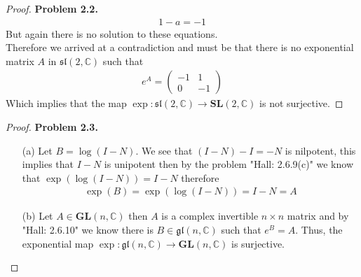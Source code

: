 \documentclass[11pt]{article}
\newcommand{\C}{\mathbb{C}}
\theoremstyle{definition}
\begin{document}
\begin{proof}{\textbf{Problem 2.2.}}
\begin{align*}
        1 - a = -1
    \end{align*}
    But again there is no solution to these equations.\\
    Therefore we arrived at a contradiction and must be that there is no
    exponential matrix $A$ in $\mathfrak{sl}(2,\C)$ such that
    \begin{align*}
        e^A = \begin{pmatrix}-1 & 1\\ 0 & -1 \end{pmatrix}
    \end{align*}
    Which implies that the map $\exp: \mathfrak{sl}(2,\C) \to \bm{SL}(2,\C)$ is
    not surjective.
\end{proof}
\cleardoublepage
\begin{proof}{\textbf{Problem 2.3.}}
\begin{itemize}
    \item [(a)] Let $B = \log(I - N)$. We see that $(I - N) - I = -N$ is
    nilpotent, this implies that $I -N$ is unipotent then by the problem
    "Hall: 2.6.9(c)" we know that $\exp(\log(I - N)) = I -N$ therefore
    \begin{align*}
        \exp(B) = \exp(\log(I - N)) = I - N = A
    \end{align*}
    \item [(b)] Let $A \in \bm{GL}(n, \C)$ then $A$ is a complex invertible
    $n \times n$ matrix and by "Hall: 2.6.10" we know there is
    $B \in \mathfrak{gl}(n, \C)$ such that $e^B = A$. Thus,
    the exponential map $\exp :\mathfrak{gl}(n,\C)\to \bm{GL}(n,\C)$
    is surjective.
\end{itemize}
\end{proof}
\cleardoublepage
\end{document}
